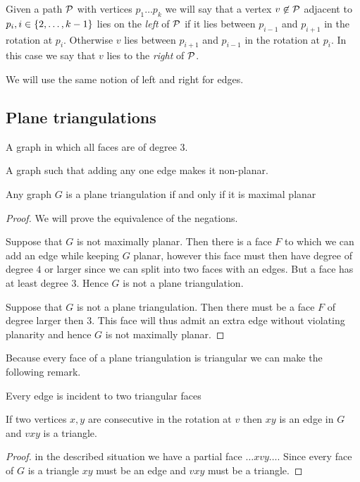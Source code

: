 Given a path $\P$ with vertices $p_1 \ldots p_k$ we will say that a vertex $v \nin \P$ adjacent to $p_i, i \in \braces{2, \ldots, k-1}$ lies on the \emph{left} of $\P$ if it lies between $p_{i-1}$ and $p_{i+1}$ in the rotation at $p_{i}$. Otherwise $v$ lies between $p_{i+1}$ and $p_{i-1}$ in the
rotation at $p_i$. In this case we say that $v$ lies to the \emph{right} of $\P$.

We will use the same notion of left and right for edges.

\subsection{Plane triangulations}

\begin{defi} 
A graph in which all faces are of degree $3$.
\end{defi}

\begin{defi} 
A graph such that adding any one edge makes it non-planar.
\end{defi}

\begin{thrm}
Any graph $G$ is a plane triangulation if and only if it is maximal planar
\end{thrm}

\begin{proof}
We will prove the equivalence of the negations.

Suppose that $G$ is not maximally planar. Then there is a face $F$ to which we can add an edge while keeping $G$ planar, however this face must then have degree of degree $4$ or larger since we can split into two faces with an edges. But a face has at least degree 3. Hence $G$ is not a plane triangulation.

Suppose that $G$ is not a plane triangulation. Then there must be a face $F$ of degree larger then $3$. This face will thus admit an extra edge without violating planarity and hence $G$ is not maximally planar.
\end{proof}

Because every face of a plane triangulation is triangular we can make the following remark.

\begin{remark}
  Every edge is incident to two triangular faces
\end{remark}

\begin{lemma}
  \label{lm:prelim:rotationEdge}
  If two vertices $x, y$ are consecutive in the rotation at $v$ then $xy$ is an edge in $G$ and $vxy$ is a triangle.
\end{lemma}
\begin{proof}
  in the described situation we have a partial face $\ldots x v y \ldots$.  Since every face of $G$ is a triangle $xy$ must be an edge and $vxy$ must be a triangle.
\end{proof}

